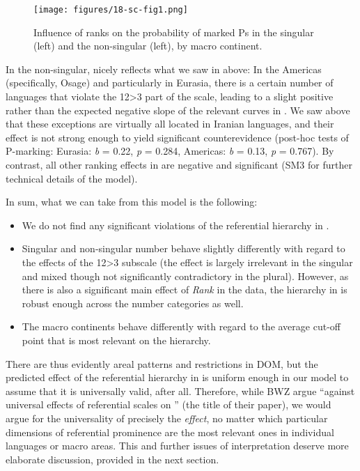\documentclass[output=paper]{langscibook}
\begin{document}
\begin{figure}
\caption{Influence of ranks on the probability of marked Ps in the singular (left) and the non-singular (left), by macro continent.}
\label{fig:sc:1}
\texttt{[image: figures/18-sc-fig1.png]}
\end{figure}

In the non-singular,  nicely reflects what we saw in  above: In the Americas (specifically, Osage) and particularly in Eurasia, there is a certain number of languages that violate the 12>3 part of the scale, leading to a slight positive rather than the expected negative slope of the relevant curves in . We saw above that these exceptions are virtually all located in Iranian languages, and their effect is not strong enough to yield significant counterevidence (post-hoc tests of P-marking: Eurasia: \textit{b}  = 0.22, \textit{p} = 0.284, Americas: \textit{b} = 0.13, \textit{p} = 0.767). By contrast, all other ranking effects in  are negative and significant (\cf SM3 for further technical details of the model).

  
In sum, what we can take from this model is the following:

\begin{itemize}
\item We do not find any significant violations of the referential hierarchy in . 
\item Singular and non-singular number behave slightly differently with regard to the effects of the 12>3 subscale (the effect is largely irrelevant in the singular and mixed though not significantly contradictory in the plural). However, as there is also a significant main effect of \textit{Rank} in the data, the hierarchy in  is robust enough across the number categories as well.
\item The macro continents behave differently with regard to the average cut-off point that is most relevant on the hierarchy.
\end{itemize}

There are thus evidently areal patterns and restrictions in DOM, but the predicted effect of the referential hierarchy in  is uniform enough in our model to assume that it is universally valid, after all. Therefore, while BWZ argue “against universal effects of referential scales on ” (\cf the title of their paper), we would argue for the universality of precisely the \textit{effect}, no matter which particular dimensions of referential prominence are the most relevant ones in individual languages or macro areas. This and further issues of interpretation deserve more elaborate discussion, provided in the next section.
\end{document}
